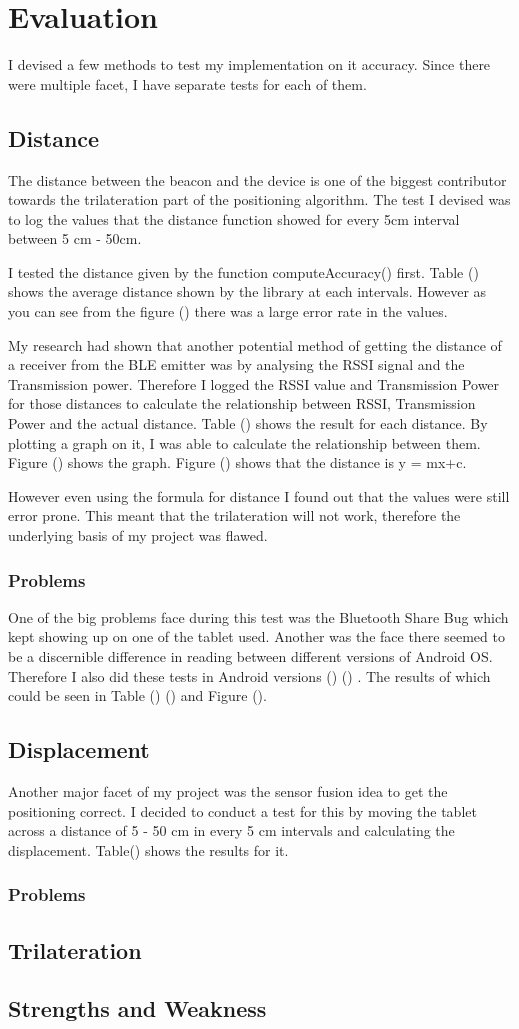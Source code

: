 \section{Evaluation}
I devised a few methods to test my implementation on it accuracy. Since there were multiple facet, I have separate tests for each of them.
\subsection{Distance}
The distance between the beacon and the device is one of the biggest contributor towards the trilateration part of the positioning algorithm. The test I devised was to log the values that the distance function showed for every 5cm interval between 5 cm - 50cm.

I tested the distance given by the function computeAccuracy() first. Table () shows the average distance shown by the library at each intervals. However as you can see from the figure () there was a large error rate in the values. 

My research had shown that another potential method of getting the distance of a receiver from the BLE emitter was by analysing the RSSI signal and the Transmission power. Therefore I logged the RSSI value and Transmission Power for those distances to calculate the relationship between RSSI, Transmission Power and the actual distance. Table () shows the result for each distance. By plotting a graph on it, I was able to calculate the relationship between them. Figure () shows the graph. Figure () shows that the distance is y = mx+c.

However even using the formula for distance I found out that the values were still error prone. This meant that the trilateration will not work, therefore the underlying basis of my project was flawed.
\subsubsection{Problems}
One of the big problems face during this test was the Bluetooth Share Bug\cite{bluetooth-share} which kept showing up on one of the tablet used. Another was the face there seemed to be a discernible difference in reading between different versions of Android OS. Therefore I also did these tests in Android versions () () . The results of which could be seen in Table () () and Figure ().

\subsection{Displacement}
Another major facet of my project was the sensor fusion idea to get the positioning correct. I decided to conduct a test for this by moving the tablet across a distance of 5 - 50 cm in every 5 cm intervals and calculating the displacement. Table() shows the results for it.
\subsubsection{Problems}

\subsection{Trilateration}

\subsection{Strengths and Weakness}
 